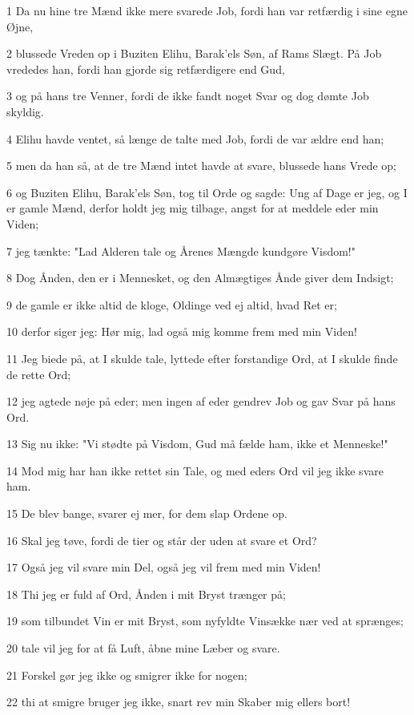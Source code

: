 \par 1 Da nu hine tre Mænd ikke mere svarede Job, fordi han var retfærdig i sine egne Øjne,
\par 2 blussede Vreden op i Buziten Elihu, Barak'els Søn, af Rams Slægt. På Job vrededes han, fordi han gjorde sig retfærdigere end Gud,
\par 3 og på hans tre Venner, fordi de ikke fandt noget Svar og dog dømte Job skyldig.
\par 4 Elihu havde ventet, så længe de talte med Job, fordi de var ældre end han;
\par 5 men da han så, at de tre Mænd intet havde at svare, blussede hans Vrede op;
\par 6 og Buziten Elihu, Barak'els Søn, tog til Orde og sagde: Ung af Dage er jeg, og I er gamle Mænd, derfor holdt jeg mig tilbage, angst for at meddele eder min Viden;
\par 7 jeg tænkte: "Lad Alderen tale og Årenes Mængde kundgøre Visdom!"
\par 8 Dog Ånden, den er i Mennesket, og den Almægtiges Ånde giver dem Indsigt;
\par 9 de gamle er ikke altid de kloge, Oldinge ved ej altid, hvad Ret er;
\par 10 derfor siger jeg: Hør mig, lad også mig komme frem med min Viden!
\par 11 Jeg biede på, at I skulde tale, lyttede efter forstandige Ord, at I skulde finde de rette Ord;
\par 12 jeg agtede nøje på eder; men ingen af eder gendrev Job og gav Svar på hans Ord.
\par 13 Sig nu ikke: "Vi stødte på Visdom, Gud må fælde ham, ikke et Menneske!"
\par 14 Mod mig har han ikke rettet sin Tale, og med eders Ord vil jeg ikke svare ham.
\par 15 De blev bange, svarer ej mer, for dem slap Ordene op.
\par 16 Skal jeg tøve, fordi de tier og står der uden at svare et Ord?
\par 17 Også jeg vil svare min Del, også jeg vil frem med min Viden!
\par 18 Thi jeg er fuld af Ord, Ånden i mit Bryst trænger på;
\par 19 som tilbundet Vin er mit Bryst, som nyfyldte Vinsække nær ved at sprænges;
\par 20 tale vil jeg for at få Luft, åbne mine Læber og svare.
\par 21 Forskel gør jeg ikke og smigrer ikke for nogen;
\par 22 thi at smigre bruger jeg ikke, snart rev min Skaber mig ellers bort!

